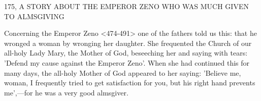 175, A STORY ABOUT THE EMPEROR ZENO
WHO WAS MUCH GIVEN TO ALMSGIVING

Concerning the Emperor Zeno <474-491> one of the fathers told us
this: that he wronged a woman by wronging her daughter. She
frequented the Church of our all-holy Lady Mary, the Mother of
God, beseeching her and saying with tears: 'Defend my cause
against the Emperor Zeno'. When she had continued this for many
days, the all-holy Mother of God appeared to her saying: 'Believe
me, woman, I frequently tried to get satisfaction for you, but his
right hand prevents me',—for he was a very good almsgiver.

